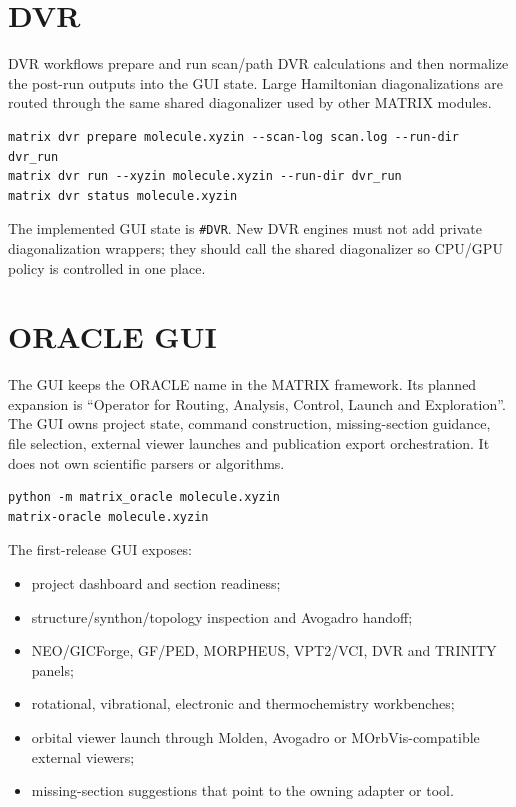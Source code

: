 \documentclass[11pt]{article}
\newcommand{\sectionname}[1]{\texttt{\##1}}
\begin{document}
\section{DVR}

DVR workflows prepare and run scan/path DVR calculations and then normalize the
post-run outputs into the GUI state.  Large Hamiltonian diagonalizations are
routed through the same shared diagonalizer used by other MATRIX modules.

\begin{lstlisting}[style=matrix]
matrix dvr prepare molecule.xyzin --scan-log scan.log --run-dir dvr_run
matrix dvr run --xyzin molecule.xyzin --run-dir dvr_run
matrix dvr status molecule.xyzin
\end{lstlisting}

The implemented GUI state is \sectionname{DVR}.  New DVR engines must not add
private diagonalization wrappers; they should call the shared diagonalizer so
CPU/GPU policy is controlled in one place.

\section{ORACLE GUI}

The GUI keeps the ORACLE name in the MATRIX framework.  Its planned expansion
is ``Operator for Routing, Analysis, Control, Launch and Exploration''.  The
GUI owns project state, command construction, missing-section guidance, file
selection, external viewer launches and publication export orchestration.  It
does not own scientific parsers or algorithms.

\begin{lstlisting}[style=matrix]
python -m matrix_oracle molecule.xyzin
matrix-oracle molecule.xyzin
\end{lstlisting}

The first-release GUI exposes:

\begin{itemize}
  \item project dashboard and section readiness;
  \item structure/synthon/topology inspection and Avogadro handoff;
  \item NEO/GICForge, GF/PED, MORPHEUS, VPT2/VCI, DVR and TRINITY panels;
  \item rotational, vibrational, electronic and thermochemistry workbenches;
  \item orbital viewer launch through Molden, Avogadro or MOrbVis-compatible
        external viewers;
  \item missing-section suggestions that point to the owning adapter or tool.
\end{itemize}
\end{document}
